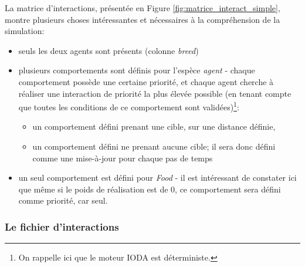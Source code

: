 La matrice d'interactions, présentée en Figure \ref{fig:matrice_interact_simple}, montre plusieurs choses intéressantes et nécessaires à la compréhension de la simulation:
\begin{itemize}
\item{seuls les deux agents sont présents (colonne \textit{breed})}
\item{plusieurs comportements sont définis pour l'espèce \textit{agent} - chaque comportement possède une certaine priorité, et chaque agent cherche à réaliser une interaction de priorité la plus élevée possible (en tenant compte que toutes les conditions de ce comportement sont validées)\footnote{On rappelle ici que le moteur IODA est déterministe.}: }
	\begin{itemize}
	\item{un comportement défini prenant une cible, sur une distance définie,}
	\item{un comportement défini ne prenant aucune cible; il sera donc défini comme une mise-à-jour pour chaque pas de temps}
	\end{itemize}
\item{un seul comportement est défini pour \textit{Food} - il est intéressant de constater ici que même si le poids de réalisation est de 0, ce comportement sera défini comme priorité, car seul.}
\end{itemize}

\subsubsection{Le fichier d'interactions}

